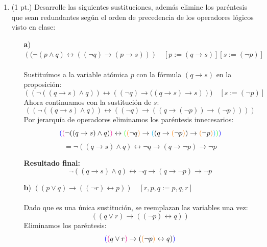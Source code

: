\documentclass[11pt,letterpaper]{article}
\begin{document}
\begin{enumerate}
    \bigskip
    
  \item (1 pt.) Desarrolle las siguientes sustituciones, además elimine los paréntesis que sean redundantes según el orden de precedencia de los operadores lógicos visto en clase:
    
    \begin{itemize}
    \item[\textbf{a})] $\left( (\neg (p \land q) \leftrightarrow \left( (\neg q) \rightarrow (p \rightarrow s) \right) \right) \quad [p := (q \rightarrow s)] [s := (\neg p)]$ \\
      \\
      Sustituímos a la variable atómica $p$ con la fórmula \( (q \rightarrow s) \) en la proposición:
      \[
      \left(( \neg ((q \rightarrow s) \land q)) \leftrightarrow \left( (\neg q) \rightarrow ((q \rightarrow s) \rightarrow s \right) \right)) \quad [s := (\neg p)]
      \]
      Ahora continuamos con la sustitución de $s$:
      \[
      \left(( \neg ((q \rightarrow s) \land q)) \leftrightarrow \left( (\neg q) \rightarrow ((q \rightarrow ( \neg p)) \rightarrow (\neg p)) \right) \right)
      \]
      Por jerarquía de operadores eliminamos los paréntesis innecesarios:
      \[
      \textcolor{blue}{(} \textcolor{magenta}{(}\neg ((q \rightarrow s) \land q) \textcolor{magenta}{)} \leftrightarrow \textcolor{green}{(} \textcolor{orange}{(}\neg q \textcolor{orange}{)} \rightarrow \textcolor{cyan}{(}(q \rightarrow \textcolor{orange}{(} \neg p \textcolor{orange}{)} ) \rightarrow \textcolor{orange}{(} \neg p \textcolor{orange}{)} \textcolor{cyan}{)} \textcolor{green}{)} \textcolor{blue}{)}
      \]
      \[
      = \neg ((q \rightarrow s) \land q) \leftrightarrow \neg q \rightarrow (q \rightarrow \neg p) \rightarrow \neg p
      \]
      
      \textbf{Resultado final:}
      \[
      \neg ((q \rightarrow s) \land q) \leftrightarrow \neg q \rightarrow (q \rightarrow \neg p) \rightarrow \neg p
      \]
      
      \bigskip
      
    \item[\textbf{b})] $\left( (p \lor q) \rightarrow ((\neg r) \leftrightarrow p) \right) \quad [r, p, q := p, q, r]$ \\
      \\
      Dado que es una única sustitución, se reemplazan las variables una vez:
      \[
      \left((q \lor r) \rightarrow \left(( \neg p) \leftrightarrow q\right) \right)
      \]
      Eliminamos los paréntesis:
      \[
      \textcolor{blue}{(} \textcolor{magenta}{(} q \lor r \textcolor{magenta}{)} \rightarrow ( \textcolor{orange}{(} \neg p \textcolor{orange}{)} \leftrightarrow q) \textcolor{blue}{)}
      \]


\end{itemize}
\end{enumerate}
\end{document}
